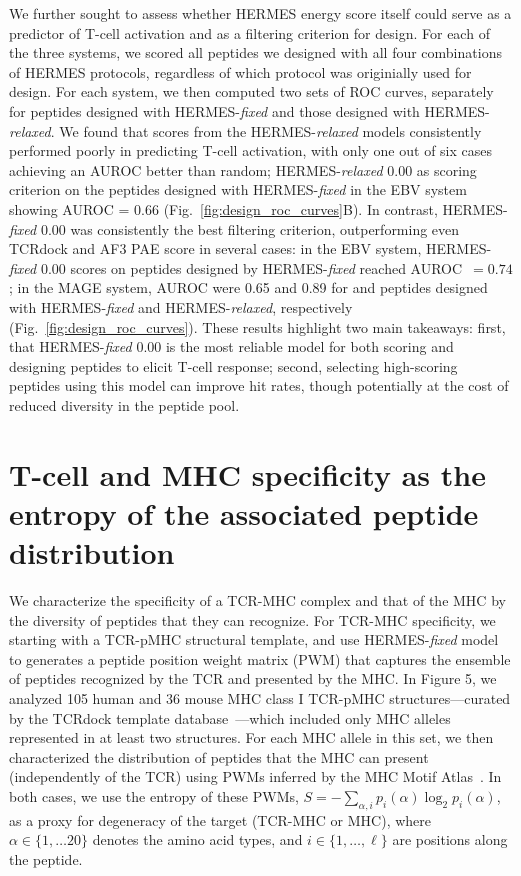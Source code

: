  We further sought to assess whether HERMES energy
score itself could serve as a predictor of T-cell activation and as a filtering criterion for
design.
For each of the three systems, we scored all peptides we designed with all four combinations of
HERMES protocols, regardless of which protocol was originially used for design. For each system, we
then computed two sets of ROC curves, separately for peptides designed with HERMES-{\em fixed} and
those designed with HERMES-{\em relaxed}.
We found that scores from the HERMES-{\em relaxed} models consistently performed poorly in
predicting T-cell activation, with only one out of six cases achieving an AUROC better than random;
HERMES-{\em relaxed} 0.00 as scoring criterion on the peptides designed with HERMES-{\em fixed} in
the EBV system showing AUROC = 0.66 (Fig.~\ref{fig:design_roc_curves}B).
In contrast, HERMES-{\em fixed} 0.00 was consistently the best filtering criterion, outperforming
even TCRdock and AF3 PAE score in several cases: in the EBV system, HERMES-{\em fixed} 0.00 scores
on peptides designed by HERMES-{\em fixed} reached AUROC~$=0.74$; in the MAGE system, AUROC were
0.65 and 0.89 for and peptides designed with HERMES-{\em fixed} and HERMES-{\em relaxed},
respectively (Fig.~\ref{fig:design_roc_curves}).
These results highlight two main takeaways: first, that HERMES-{\em fixed} 0.00 is the most reliable
model for both scoring and designing peptides to elicit T-cell response; second, selecting
high-scoring peptides using this model can improve hit rates, though potentially at the cost of
reduced diversity in the peptide pool.



\section{T-cell and MHC specificity as the entropy of the associated peptide distribution}
 We characterize the specificity of a TCR-MHC complex and that of the MHC by the diversity of
 peptides that they can recognize. For TCR-MHC specificity, we starting with a TCR-pMHC structural
 template, and use HERMES-{\em fixed} model to generates a peptide position weight matrix (PWM) that
 captures the ensemble of peptides recognized by the TCR and presented by the MHC. In Figure 5, we
 analyzed 105 human and 36 mouse MHC class I TCR-pMHC structures---curated by the TCRdock template
 database \cite{Bradley2023-rl}---which included only MHC alleles represented in at least two
 structures. For each MHC allele in this set, we then characterized the distribution of peptides
 that the MHC can present (independently of the TCR) using PWMs inferred by the MHC Motif
 Atlas \cite{Tadros2023-ij}. In both cases, we use the entropy of these PWMs, $S= -\sum_{\alpha, i}
 p_i(\alpha) \log_2p_i(\alpha)$, as a proxy for degeneracy of the target (TCR-MHC or MHC), where
 $\alpha \in \{1,\dots 20\}$ denotes the amino acid types, and $i \in\{ 1, \dots, \ell\}$ are
 positions along the peptide.
 
